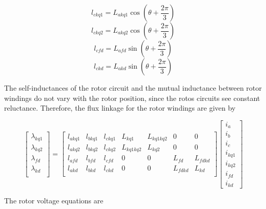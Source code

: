 \begin{equation}
	l_{ckq1} = L_{akq1} \cos (\theta + \dfrac{2 \pi}{3})
\end{equation}
\begin{equation}
	l_{ckq2} = L_{akq2} \cos (\theta + \dfrac{2 \pi}{3})
\end{equation}
\begin{equation}
	l_{cfd} = L_{afd} \sin (\theta + \dfrac{2 \pi}{3})
\end{equation}
\begin{equation}
	l_{ckd} = L_{akd} \sin (\theta + \dfrac{2 \pi}{3})
\end{equation}

The self-inductances of the rotor circuit and the mutual inductance between rotor windings do not vary with the rotor position, since the rotos circuits see constant reluctance. Therefore, the flux linkage for the rotor windings are given by

\begin{equation} \label{eq:FluxRotor}
	\begin{bmatrix}
		\lambda_{kq1} \\
		\lambda_{kq2} \\
		\lambda_{fd} \\
		\lambda_{kd} \\
	\end{bmatrix}
	=
	\begin{bmatrix}
		l_{akq1} & l_{bkq1} & l_{ckq1} & L_{kq1} & L_{kq1kq2} & 0 & 0 \\  
		l_{akq2} & l_{bkq2} & l_{ckq2} & L_{kq1kq2} & L_{kq2} & 0 & 0 \\ 
		l_{afd} & l_{bfd} & l_{cfd} & 0 & 0 & L_{fd} & L_{fdkd} \\
		l_{akd} & l_{bkd} & l_{ckd} & 0 & 0 & L_{fdkd} & L_{kd} \\  
	\end{bmatrix}
	\begin{bmatrix}
		i_a \\
		i_b \\
		i_c \\
		i_{kq1} \\
		i_{kq2} \\
		i_{fd} \\
		i_{kd}
	\end{bmatrix}
\end{equation}

The rotor voltage equations are

